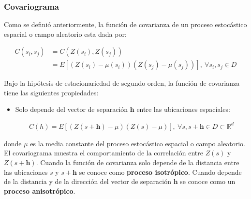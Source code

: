 \documentclass[
]{book}
\begin{document}
\hypertarget{covariograma}{%
\subsubsection*{Covariograma}\label{covariograma}}

Como se definió anteriormente, la función de covarianza de un proceso estocástico espacial o campo aleatorio esta dada por:

\begin{align}
    C(s_i,s_j)&=C(Z(s_i),Z(s_j))\\
    &= E[(Z(s_i)-\mu(s_i)) (Z(s_j)-\mu(s_j))],\ \forall s_i,s_j\in D
\end{align}

Bajo la hipótesis de estacionariedad de segundo orden, la función de covarianza tiene las siguientes propiedades:

\begin{itemize}
\item
  Solo depende del vector de separación \(\textbf{h}\) entre las ubicaciones espaciales:

  \begin{align}
      C(h)=E[(Z(s+\textbf{h})-\mu)(Z(s)-\mu)],\ \forall s,s+\textbf{h} \in D\subset \mathbb{R}^d  
    \end{align}
\end{itemize}

donde \(\mu\) es la media constante del proceso estocástico espacial o campo aleatorio. El covariograma muestra el comportamiento de la correlación entre \(Z(s)\) y \(Z(s+\textbf{h})\). Cuando la función de covarianza solo depende de la distancia entre las ubicaciones \(s\) y \(s+\textbf{h}\) se conoce como \textbf{proceso isotrópico}. Cuando depende de la distancia y de la dirección del vector de separación \(\textbf{h}\) se conoce como un \textbf{proceso anisotrópico}.
\end{document}
